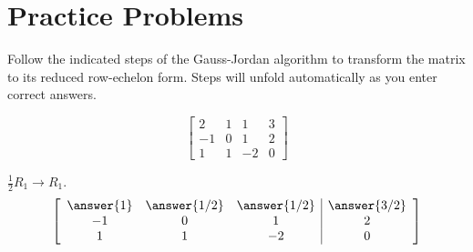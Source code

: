 \documentclass{ximera}
\begin{document}
 
 


\section*{Practice Problems}


\begin{problem}\label{prob:twowaystorref1}
Follow the indicated steps of the Gauss-Jordan algorithm to transform the matrix to its reduced row-echelon form.  Steps will unfold automatically as you enter correct answers.



$$\left[\begin{array}{ccc|c}  2&1&1&3\\-1&0&1&2\\1&1&-2&0
  \end{array}\right]$$

  
 \begin{prompt}  $\frac{1}{2}R_1\rightarrow R_1$.
$$ \left[\begin{array}{ccc|c}   \answer{1}&\answer{1/2}&\answer{1/2}&\answer{3/2}\\-1&0&1&2\\1&1&-2&0
  \end{array}\right]$$
 \end{prompt} 


\end{problem}
\end{document}
